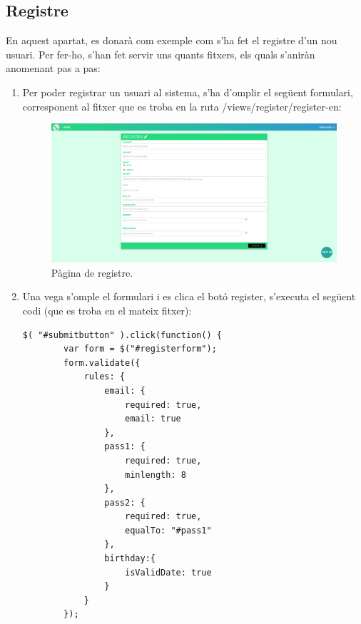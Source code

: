 \documentclass[11pt,catalan,listoffigures,listoftables]{tfgetsinf}
\begin{document}
\subsection{Registre}
En aquest apartat, es donarà com exemple com s'ha fet el registre d'un nou usuari. Per fer-ho, s'han fet servir uns quants fitxers, els quals s'aniràn anomenant pas a pas:
\newpage
\begin{enumerate}
	\item Per poder registrar un usuari al sistema, s'ha d'omplir el següent formulari, corresponent al fitxer que es troba en la ruta /views/register/register-en:
\begin{figure}[h]
\includegraphics[width=15cm]{images/image13}
\centering
\caption[Figura 3.1]{Pàgina de registre.}
\centering
\end{figure}
\item Una vega s'omple el formulari i es clica el botó register, s'executa el següent codi (que es troba en el mateix fitxer):
\begin{lstlisting}
$( "#submitbutton" ).click(function() {
        var form = $("#registerform");
        form.validate({
            rules: {
                email: {
                    required: true,
                    email: true
                },
                pass1: {
                    required: true,
                    minlength: 8
                },
                pass2: {
                    required: true,
                    equalTo: "#pass1"
                },
                birthday:{
                    isValidDate: true
                }
            }
        });


\end{lstlisting}
\end{enumerate}
\end{document}
